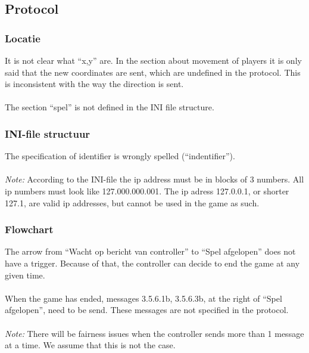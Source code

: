 \documentclass[a4paper,twoside,11pt]{article}
\begin{document}

\subsection{Protocol} %
\label{sec:protocol}

  \subsubsection{Locatie} %
  \label{sub:locatie}
    It is not clear what ``x,y'' are. In the section about movement of players it is only said that the new coordinates are sent, which are undefined in the protocol. This is inconsistent with the way the direction is sent. \\ \\
    The section ``spel'' is not defined in the INI file structure.\\



  \subsubsection{INI-file structuur} %
  \label{sub:ini_file_structuur}

    The specification of identifier is wrongly spelled (``indentifier''). \\ \\

    \emph{Note:} According to the INI-file the ip address must be in blocks of 3 numbers. All ip numbers must look like 127.000.000.001. The ip adress 127.0.0.1, or shorter 127.1, are valid ip addresses, but cannot be used in the game as such. \\


  \subsubsection{Flowchart} %
  \label{sub:flowchart}
    The arrow from ``Wacht op bericht van controller'' to ``Spel afgelopen'' does not have a trigger. Because of that, the controller can decide to end the game at any given time.\\ \\
    When the game has ended, messages 3.5.6.1b, 3.5.6.3b, at the right of ``Spel afgelopen'', need to be send. These messages are not specified in the protocol. \\ \\
    \emph{Note:} There will be fairness issues when the controller sends more than 1 message at a time. We assume that this is not the case.
    
\end{document}
